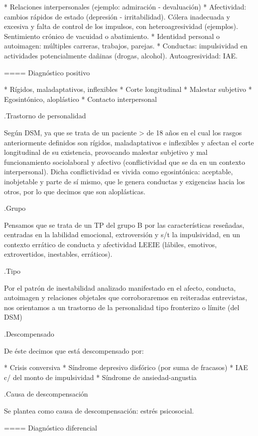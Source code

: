* Relaciones interpersonales (ejemplo: admiración - devaluación)
* Afectividad: cambios rápidos de estado (depresión - irritabilidad). Cólera inadecuada y excesiva y falta de control de los impulsos, con heteroagresividad (ejemplos). Sentimiento crónico de vacuidad o abatimiento.
* Identidad personal o autoimagen: múltiples carreras, trabajos, parejas.
* Conductas: impulsividad en actividades potencialmente dañinas (drogas, alcohol). Autoagresividad: IAE.

==== Diagnóstico positivo

* Rígidos, maladaptativos, inflexibles
* Corte longitudinal
* Malestar subjetivo
* Egosintónico, aloplástico
* Contacto interpersonal

.Trastorno de personalidad

Según DSM, ya que se trata de un paciente > de 18 años en el cual los rasgos anteriormente definidos son rígidos, maladaptativos e inflexibles y afectan el corte longitudinal de su existencia, provocando malestar subjetivo y mal funcionamiento sociolaboral y afectivo (conflictividad que se da en un contexto interpersonal). Dicha conflictividad es vivida como egosintónica: aceptable, inobjetable y parte de sí mismo, que le genera conductas y exigencias hacia los otros, por lo que decimos que son aloplásticas.

.Grupo

Pensamos que se trata de un TP del grupo B por las características reseñadas, centradas en la labilidad emocional, extroversión y s/t la impulsividad, en un contexto errático de conducta y afectividad LEEIE (lábiles, emotivos, extrovertidos, inestables, erráticos).

.Tipo

Por el patrón de inestabilidad analizado manifestado en el afecto, conducta, autoimagen y relaciones objetales que corroboraremos en reiteradas entrevistas, nos orientamos a un trastorno de la personalidad tipo fronterizo o límite (del DSM)

.Descompensado

De éste decimos que está descompensado por:

* Crisis conversiva
* Síndrome depresivo disfórico (por suma de fracasos)
* IAE c/ del monto de impulsividad
* Síndrome de ansiedad-angustia

.Causa de descompensación

Se plantea como causa de descompensación: estrés psicosocial.

==== Diagnóstico diferencial

